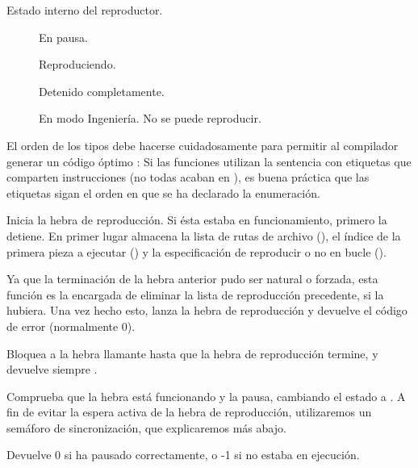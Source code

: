 \begin{description}[style=nextline]
	\item[enum player\_state\_t]
	
	Estado interno del reproductor.

	\begin{description}
		\item[] En pausa.
		\item[] Reproduciendo.
		\item[] Detenido completamente.
		\item[] En modo Ingeniería. No se puede reproducir.
	\end{description}

	El orden de los tipos debe hacerse cuidadosamente para permitir al compilador generar un código óptimo \cite{vikman_switch}: Si las funciones utilizan la sentencia  con etiquetas que comparten instrucciones (no todas acaban en ), es buena práctica que las etiquetas sigan el orden en que se ha declarado la enumeración.
	
	\item[\code{int player\_start(char **playlist, int n, int loop)}]
	Inicia la hebra de reproducción. Si ésta estaba en funcionamiento, primero la detiene. En primer lugar almacena la lista de rutas de archivo (), el índice de la primera pieza a ejecutar () y la especificación de reproducir o no en bucle ().
	
	Ya que la terminación de la hebra anterior pudo ser natural o forzada, esta función es la encargada de eliminar la lista de reproducción precedente, si la hubiera. Una vez hecho esto, lanza la hebra de reproducción y devuelve el código de error (normalmente 0).
	
	\item[\code{int player\_wait()}]
	
	Bloquea a la hebra llamante hasta que la hebra de reproducción termine, y devuelve siempre .
	
	\item[\code{int player\_pause()}]
	
	Comprueba que la hebra está funcionando y la pausa, cambiando el estado a . A fin de evitar la espera activa de la hebra de reproducción, utilizaremos un semáforo de sincronización, que explicaremos más abajo.
	
	Devuelve 0 si ha pausado correctamente, o -1 si no estaba en ejecución.
	

\end{description}
